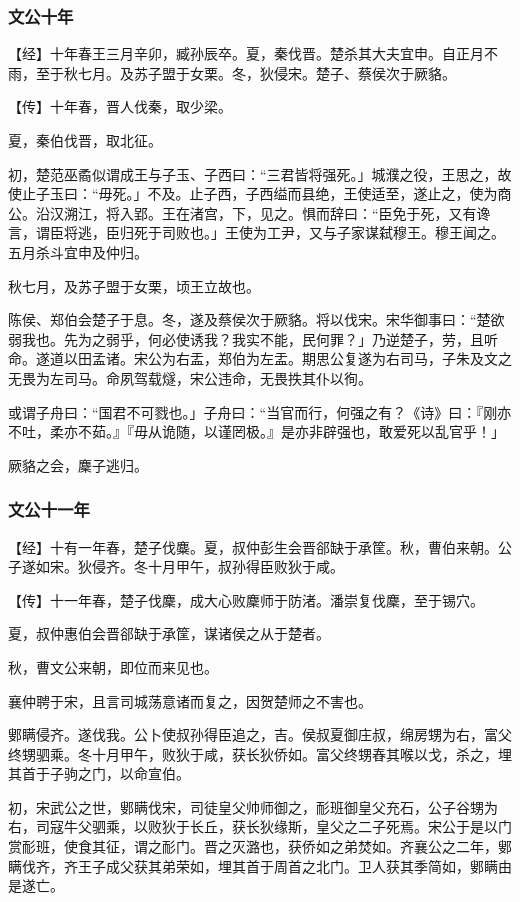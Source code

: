 \documentclass[]{article}
\begin{document}
\hypertarget{header-n1162}{%
\subsubsection{文公十年}\label{header-n1162}}

【经】十年春王三月辛卯，臧孙辰卒。夏，秦伐晋。楚杀其大夫宜申。自正月不雨，至于秋七月。及苏子盟于女栗。冬，狄侵宋。楚子、蔡侯次于厥貉。

【传】十年春，晋人伐秦，取少梁。

夏，秦伯伐晋，取北征。

初，楚范巫矞似谓成王与子玉、子西曰：``三君皆将强死。」城濮之役，王思之，故使止子玉曰：``毋死。」不及。止子西，子西缢而县绝，王使适至，遂止之，使为商公。沿汉溯江，将入郢。王在渚宫，下，见之。惧而辞曰：``臣免于死，又有谗言，谓臣将逃，臣归死于司败也。」王使为工尹，又与子家谋弑穆王。穆王闻之。五月杀斗宜申及仲归。

秋七月，及苏子盟于女栗，顷王立故也。

陈侯、郑伯会楚子于息。冬，遂及蔡侯次于厥貉。将以伐宋。宋华御事曰：``楚欲弱我也。先为之弱乎，何必使诱我？我实不能，民何罪？」乃逆楚子，劳，且听命。遂道以田孟诸。宋公为右盂，郑伯为左盂。期思公复遂为右司马，子朱及文之无畏为左司马。命夙驾载燧，宋公违命，无畏抶其仆以徇。

或谓子舟曰：``国君不可戮也。」子舟曰：``当官而行，何强之有？《诗》曰：『刚亦不吐，柔亦不茹。』『毋从诡随，以谨罔极。』是亦非辟强也，敢爱死以乱官乎！」

厥貉之会，麇子逃归。

\hypertarget{header-n1173}{%
\subsubsection{文公十一年}\label{header-n1173}}

【经】十有一年春，楚子伐麋。夏，叔仲彭生会晋郤缺于承筐。秋，曹伯来朝。公子遂如宋。狄侵齐。冬十月甲午，叔孙得臣败狄于咸。

【传】十一年春，楚子伐麇，成大心败麇师于防渚。潘崇复伐麇，至于锡穴。

夏，叔仲惠伯会晋郤缺于承筐，谋诸侯之从于楚者。

秋，曹文公来朝，即位而来见也。

襄仲聘于宋，且言司城荡意诸而复之，因贺楚师之不害也。

鄋瞒侵齐。遂伐我。公卜使叔孙得臣追之，吉。侯叔夏御庄叔，绵房甥为右，富父终甥驷乘。冬十月甲午，败狄于咸，获长狄侨如。富父终甥舂其喉以戈，杀之，埋其首于子驹之门，以命宣伯。

初，宋武公之世，鄋瞒伐宋，司徒皇父帅师御之，耏班御皇父充石，公子谷甥为右，司寇牛父驷乘，以败狄于长丘，获长狄缘斯，皇父之二子死焉。宋公于是以门赏耏班，使食其征，谓之耏门。晋之灭潞也，获侨如之弟焚如。齐襄公之二年，鄋瞒伐齐，齐王子成父获其弟荣如，埋其首于周首之北门。卫人获其季简如，鄋瞒由是遂亡。
\end{document}
